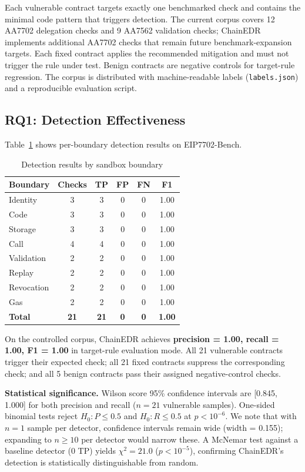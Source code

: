 Each vulnerable contract targets exactly one benchmarked check and contains the minimal code pattern that triggers detection. The current corpus covers 12 AA7702 delegation checks and 9 AA7562 validation checks; ChainEDR implements additional AA7702 checks that remain future benchmark-expansion targets. Each fixed contract applies the recommended mitigation and must not trigger the rule under test. Benign contracts are negative controls for target-rule regression. The corpus is distributed with machine-readable labels (\texttt{labels.json}) and a reproducible evaluation script.

\subsection{RQ1: Detection Effectiveness}

Table~\ref{tab:rq1} shows per-boundary detection results on EIP7702-Bench.

\begin{table}[h]
\centering
\caption{Detection results by sandbox boundary}
\label{tab:rq1}
\begin{tabular}{lccccc}
\hline
\textbf{Boundary} & \textbf{Checks} & \textbf{TP} & \textbf{FP} & \textbf{FN} & \textbf{F1} \\
\hline
Identity    & 3 & 3 & 0 & 0 & 1.00 \\
Code        & 3 & 3 & 0 & 0 & 1.00 \\
Storage     & 3 & 3 & 0 & 0 & 1.00 \\
Call        & 4 & 4 & 0 & 0 & 1.00 \\
Validation  & 2 & 2 & 0 & 0 & 1.00 \\
Replay      & 2 & 2 & 0 & 0 & 1.00 \\
Revocation  & 2 & 2 & 0 & 0 & 1.00 \\
Gas         & 2 & 2 & 0 & 0 & 1.00 \\
\hline
\textbf{Total} & \textbf{21} & \textbf{21} & \textbf{0} & \textbf{0} & \textbf{1.00} \\
\hline
\end{tabular}
\end{table}

On the controlled corpus, ChainEDR achieves \textbf{precision = 1.00, recall = 1.00, F1 = 1.00} in target-rule evaluation mode. All 21 vulnerable contracts trigger their expected check; all 21 fixed contracts suppress the corresponding check; and all 5 benign contracts pass their assigned negative-control checks.

\textbf{Statistical significance.} Wilson score 95\% confidence intervals are [0.845, 1.000] for both precision and recall ($n=21$ vulnerable samples). One-sided binomial tests reject $H_0: P \leq 0.5$ and $H_0: R \leq 0.5$ at $p < 10^{-6}$. We note that with $n=1$ sample per detector, confidence intervals remain wide (width = 0.155); expanding to $n \geq 10$ per detector would narrow these. A McNemar test against a baseline detector (0 TP) yields $\chi^2 = 21.0$ ($p < 10^{-5}$), confirming ChainEDR's detection is statistically distinguishable from random.

